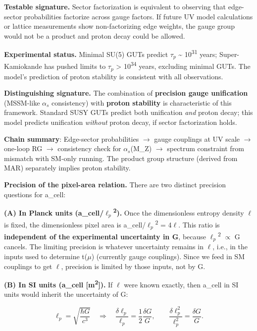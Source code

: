 \documentclass[11pt,a4paper]{article}
\theoremstyle{remark}
\begin{document}
\textbf{Testable signature.} Sector factorization is equivalent to observing that
edge-sector probabilities factorize across gauge factors. If future UV model
calculations or lattice measurements show non-factorizing edge weights, the
gauge group would not be a product and proton decay could be allowed.

\textbf{Experimental status.} Minimal SU(5) GUTs predict \(\tau_p\) \textasciitilde{} 10\textsuperscript{31}
years; Super-Kamiokande has pushed limits to \(\tau_p\) \textgreater{} 10\textsuperscript{34} years,
excluding minimal GUTs. The model's prediction of proton stability is
consistent with all observations.

\textbf{Distinguishing signature.} The combination of \textbf{precision gauge
unification} (MSSM-like \(\alpha_s\) consistency) with \textbf{proton stability}
is characteristic of this framework. Standard SUSY GUTs predict both
unification \emph{and} proton decay; this model predicts unification \emph{without}
proton decay, if sector factorization holds.

\textbf{Chain summary}: Edge-sector probabilities \ensuremath{\to} gauge couplings at UV scale
\ensuremath{\to} one-loop RG \ensuremath{\to} consistency check for \(\alpha_s\)(M\_Z) \ensuremath{\to} spectrum
constraint from mismatch with SM-only running. The product group structure
(derived from MAR) separately implies proton stability.

\textbf{Precision of the pixel-area relation.} There are two distinct precision questions for a\_cell:

\textbf{(A) In Planck units (a\_cell/\(\ell_p\)\textsuperscript{2}).} Once the dimensionless entropy density \ensuremath{\ell} is fixed, the dimensionless pixel area is a\_cell/\(\ell_p\)\textsuperscript{2} = 4\ensuremath{\ell}. This ratio is \textbf{independent of the experimental uncertainty in G}, because \(\ell_p\)\textsuperscript{2} \ensuremath{\propto} G cancels. The limiting precision is whatever uncertainty remains in \ensuremath{\ell}, i.e., in the inputs used to determine t(\ensuremath{\mu}) (currently gauge couplings). Since we feed in SM couplings to get \ensuremath{\ell}, precision is limited by those inputs, not by G.

\textbf{(B) In SI units (a\_cell {[}m\textsuperscript{2}{]}).} If \ensuremath{\ell} were known exactly, then a\_cell in SI units would inherit the uncertainty of G:

\[
\ell_p = \sqrt{\frac{\hbar G}{c^3}} \quad \Rightarrow \quad
\frac{\delta \ell_p}{\ell_p} = \frac{1}{2}\frac{\delta G}{G}, \qquad
\frac{\delta \ell_p^2}{\ell_p^2} = \frac{\delta G}{G}.
\]
\end{document}
